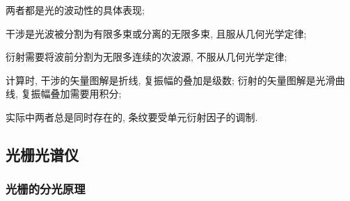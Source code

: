 \documentclass{ctexart}
\begin{document}

\begin{remark}[干涉与衍射的比较]
    \mbox{}
    \begin{cenum}
        \item 两者都是光的波动性的具体表现;
        \item 干涉是光波被分割为有限多束或分离的无限多束, 且服从几何光学定律;
        \item 衍射需要将波前分割为无限多连续的次波源, 不服从几何光学定律;
        \item 计算时, 干涉的矢量图解是折线, 复振幅的叠加是级数; 衍射的矢量图解是光滑曲线, 复振幅叠加需要用积分;
        \item 实际中两者总是同时存在的, 条纹要受单元衍射因子的调制.
    \end{cenum}
\end{remark}


\subsection{光栅光谱仪} %
\label{sub:光栅光谱仪}

\subsubsection{光栅的分光原理} %
\label{ssub:光栅的分光原理}
\end{document}
